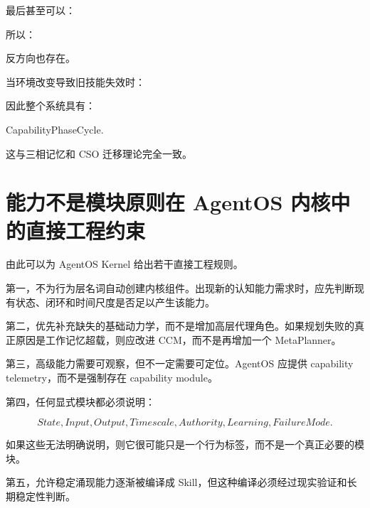 最后甚至可以：

\begin{statementbox}
\centering
{}
\end{statementbox}

所以：

\begin{statementbox}
\centering
{}
\end{statementbox}

反方向也存在。

当环境改变导致旧技能失效时：

\begin{statementbox}
\centering
{}
\end{statementbox}

因此整个系统具有：

\begin{statementbox}
CapabilityPhaseCycle.
\end{statementbox}

这与三相记忆和 CSO 迁移理论完全一致。

\section{能力不是模块原则在 AgentOS 内核中的直接工程约束}

由此可以为 AgentOS Kernel 给出若干直接工程规则。

第一，不为行为层名词自动创建内核组件。出现新的认知能力需求时，应先判断现有状态、闭环和时间尺度是否足以产生该能力。

第二，优先补充缺失的基础动力学，而不是增加高层代理角色。如果规划失败的真正原因是工作记忆超载，则应改进 CCM，而不是再增加一个 MetaPlanner。

第三，高级能力需要可观察，但不一定需要可定位。AgentOS 应提供 capability telemetry，而不是强制存在 capability module。

第四，任何显式模块都必须说明：

\[
State,
Input,
Output,
Timescale,
Authority,
Learning,
FailureMode.
\]

如果这些无法明确说明，则它很可能只是一个行为标签，而不是一个真正必要的模块。

第五，允许稳定涌现能力逐渐被编译成 Skill，但这种编译必须经过现实验证和长期稳定性判断。

